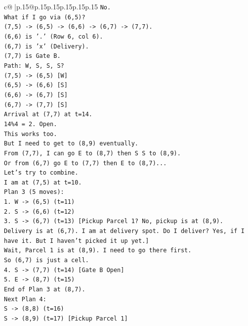 \documentclass{article}
\begin{document}
{\begin{supertabular}{c@{$\;$}|p{.15\linewidth}@{}p{.15\linewidth}p{.15\linewidth}p{.15\linewidth}p{.15\linewidth}p{.15\linewidth}}
{{{\texttt{No.} \\
\texttt{What if I go via (6,5)?} \\
\texttt{(7,5) {-}> (6,5) {-}> (6,6) {-}> (6,7) {-}> (7,7).} \\
\texttt{(6,6) is '.' (Row 6, col 6).} \\
\texttt{(6,7) is 'x' (Delivery).} \\
\texttt{(7,7) is Gate B.} \\
\texttt{Path: W, S, S, S?} \\
\texttt{(7,5) {-}> (6,5) {[}W{]}} \\
\texttt{(6,5) {-}> (6,6) {[}S{]}} \\
\texttt{(6,6) {-}> (6,7) {[}S{]}} \\
\texttt{(6,7) {-}> (7,7) {[}S{]}} \\
\texttt{Arrival at (7,7) at t=14.} \\
\texttt{14\%4 = 2. Open.} \\
\texttt{This works too.} \\
\texttt{But I need to get to (8,9) eventually.} \\
\texttt{From (7,7), I can go E to (8,7) then S S to (8,9).} \\
\texttt{Or from (6,7) go E to (7,7) then E to (8,7)...} \\
\texttt{Let's try to combine.} \\
\texttt{I am at (7,5) at t=10.} \\
\texttt{Plan 3 (5 moves):} \\
\texttt{1. W {-}> (6,5) (t=11)} \\
\texttt{2. S {-}> (6,6) (t=12)} \\
\texttt{3. S {-}> (6,7) (t=13) {[}Pickup Parcel 1? No, pickup is at (8,9). Delivery is at (6,7). I am at delivery spot. Do I deliver? Yes, if I have it. But I haven't picked it up yet.{]}} \\
\texttt{Wait, Parcel 1 is at (8,9). I need to go there first.} \\
\texttt{So (6,7) is just a cell.} \\
\texttt{4. S {-}> (7,7) (t=14) {[}Gate B Open{]}} \\
\texttt{5. E {-}> (8,7) (t=15)} \\
\texttt{End of Plan 3 at (8,7).} \\
\texttt{Next Plan 4:} \\
\texttt{S {-}> (8,8) (t=16)} \\
\texttt{S {-}> (8,9) (t=17) {[}Pickup Parcel 1{]}} \\
}}}
\end{supertabular}}
\end{document}
